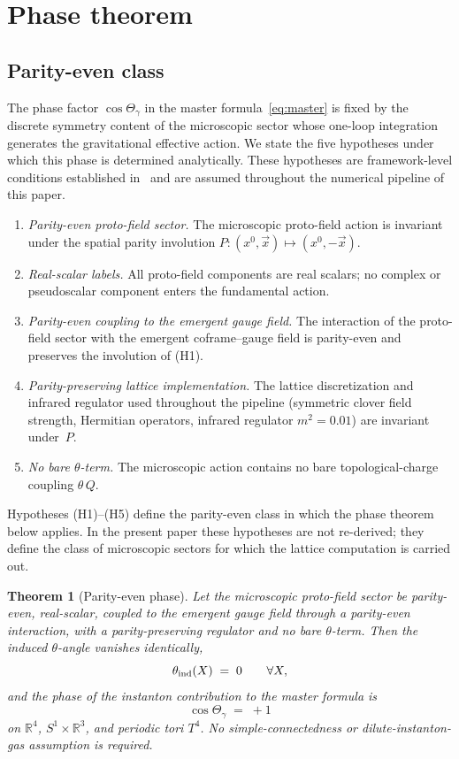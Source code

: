 \documentclass[a4paper,11pt]{article}
\newtheorem{theorem}{Theorem}[section]
\theoremstyle{definition}
\newcommand{\bR}{\mathbb{R}}
\begin{document}
\section{Phase theorem}
\label{sec:phase}

\subsection{Parity-even class}
\label{subsec:phase-class}

The phase factor $\cos\Theta_\gamma$ in the master
formula~\eqref{eq:master} is fixed by the discrete symmetry content
of the microscopic sector whose one-loop integration generates the
gravitational effective action. We state the five hypotheses under
which this phase is determined analytically. These hypotheses are
framework-level conditions established
in~\cite{companion-structural} and are assumed throughout the
numerical pipeline of this paper.

\begin{enumerate}
\item[(H1)] \emph{Parity-even proto-field sector.} The microscopic
proto-field action is invariant under the spatial parity involution
$P : (x^0,\vec{x})\mapsto(x^0,-\vec{x})$.
\item[(H2)] \emph{Real-scalar labels.} All proto-field components are
real scalars; no complex or pseudoscalar component enters the
fundamental action.
\item[(H3)] \emph{Parity-even coupling to the emergent gauge field.}
The interaction of the proto-field sector with the emergent
coframe--gauge field is parity-even and preserves the involution
of (H1).
\item[(H4)] \emph{Parity-preserving lattice implementation.} The
lattice discretization and infrared regulator used throughout the
pipeline (symmetric clover field strength, Hermitian operators,
infrared regulator $m^2 = 0.01$) are invariant under~$P$.
\item[(H5)] \emph{No bare $\theta$-term.} The microscopic action
contains no bare topological-charge coupling $\theta\,Q$.
\end{enumerate}

Hypotheses (H1)--(H5) define the parity-even class in which the
phase theorem below applies. In the present paper these hypotheses
are not re-derived; they define the class of microscopic sectors for
which the lattice computation is carried out.

\begin{theorem}[Parity-even phase]
\label{thm:phase}
Let the microscopic proto-field sector be parity-even, real-scalar,
coupled to the emergent gauge field through a parity-even
interaction, with a parity-preserving regulator and no bare
$\theta$-term. Then the induced $\theta$-angle vanishes identically,
\[
\theta_{\rm ind}(X) \;=\; 0 \qquad \forall X,
\]
and the phase of the instanton contribution to the master formula is
\[
\cos\Theta_\gamma \;=\; +1
\]
on $\bR^4$, $S^1\times\bR^3$, and periodic tori $T^4$. No
simple-connectedness or dilute-instanton-gas assumption is required.
\end{theorem}
\end{document}
